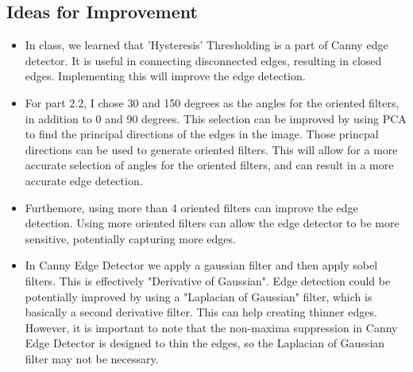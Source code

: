 \documentclass[12pt]{article}
\begin{document}
\subsection{Ideas for Improvement}
\begin{itemize}
    \item In class, we learned that 'Hysteresis' Thresholding is a part of Canny edge detector. It is useful in connecting disconnected edges, resulting in closed edges. Implementing this will improve the edge detection.
    \item For part 2.2, I chose 30 and 150 degrees as the angles for the oriented filters, in addition to 0 and 90 degrees. This selection can be improved by using PCA to find the principal directions of the edges in the image. Those princpal directions can be used to generate oriented filters. This will allow for a more accurate selection of angles for the oriented filters, and can result in a more accurate edge detection.
    \item Furthemore, using more than 4 oriented filters can improve the edge detection. Using more oriented filters can allow the edge detector to be more sensitive, potentially capturing more edges.
    \item In Canny Edge Detector we apply a gaussian filter and then apply sobel filters. This is effectively "Derivative of Gaussian". Edge detection could be potentially improved by using a "Laplacian of Gaussian" filter, which is basically a second derivative filter. This can help creating thinner edges. However, it is important to note that the non-maxima suppression in Canny Edge Detector is designed to thin the edges, so the Laplacian of Gaussian filter may not be necessary.
\end{itemize}
\end{document}

